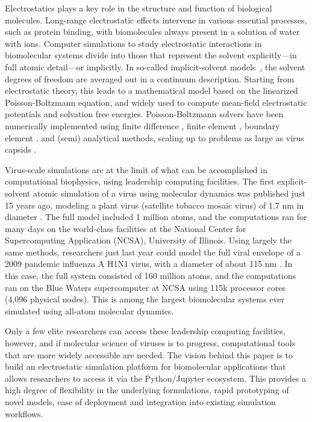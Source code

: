 Electrostatics plays a key role in the structure and function of biological molecules.
Long-range electrostatic effects intervene in various essential processes, such as protein binding, with biomolecules always present in a solution of water with ions.
Computer simulations to study electrostatic interactions in biomolecular systems divide into those that represent the solvent explicitly---in full atomic detail---or implicitly.
In so-called implicit-solvent models~\cite{RouxSimonson1999,DecherchiETal2015}, the solvent degrees of freedom are averaged out in a continuum description.
Starting from electrostatic theory, this leads to a mathematical model based on the linearized Poisson-Boltzmann equation, and widely used to compute mean-field electrostatic potentials and solvation free energies.
Poisson-Boltzmann solvers have been numerically implemented using finite difference \cite{RocchiaAlexovHonig2001, BakerETal2001}, finite element \cite{BakerETal2001,BondETal2010,HolstETal2012}, boundary element \cite{AltmanBardhanWhiteTidor2009, GengKrasny2013, ZhangPengHuangPitsianisSunLu2015, CooperBardhanBarba2014}, and (semi) analytical \cite{LotanHead-Gordon2006,FelbergETal2017} methods, scaling up to problems as large as virus capsids \cite{ZhangETal2019,MartinezETal2019}.

Virus-scale simulations are at the limit of what can be accomplished in computational biophysics, using leadership computing facilities.
The first explicit-solvent atomic simulation of a virus using molecular dynamics was published just 15 years ago, modeling a plant virus (satellite tobacco mosaic virus) of 1.7 nm in diameter \cite{FreddolinoETal2006}.
The full model included 1 million atoms, and the computations ran for many days on the world-class facilities at the National Center for Supercomputing Application (NCSA), University of Illinois.
Using largely the same methods, researchers just last year could model the full viral envelope of a 2009 pandemic influenza A H1N1 virus, with a diameter of about 115 nm \cite{DurrantETal2020}.
In this case, the full system consisted of 160 million atoms, and the computations ran on the Blue Waters supercomputer at NCSA using 115k processor cores (4,096 physical nodes).
This is among the largest biomolecular systems ever simulated using all-atom molecular dynamics.

Only a few elite researchers can access these leadership computing facilities, however, and if molecular science of viruses is to progress, computational tools that are more widely accessible are needed.
The vision behind this paper is to build an electrostatic simulation platform for biomolecular applications that allows researchers to access it via the Python/Jupyter ecosystem. This provides a high degree of flexibility in the underlying formulations, rapid prototyping of novel models, ease of deployment and integration into existing simulation workflows.

